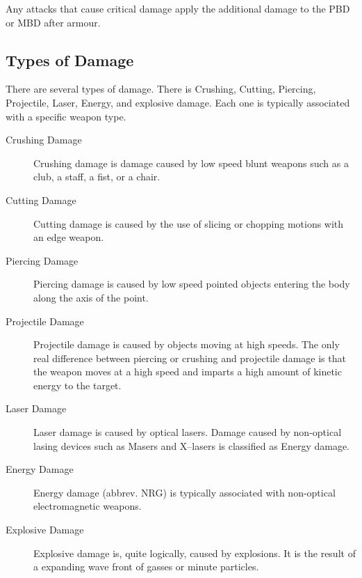 Any attacks that cause critical damage apply the additional damage to
the PBD or MBD after armour.

\subsection{Types of Damage}

There are several types of damage. There is Crushing, Cutting,
Piercing, Projectile, Laser, Energy, and explosive damage. Each one
is typically associated with a specific weapon type.

\begin{description}
	\item[Crushing Damage]
	Crushing damage is damage caused by low speed blunt weapons such as
	a club, a staff, a fist, or a chair.

	\item[Cutting Damage]
	Cutting damage is caused by the use of slicing or chopping motions
	with an edge weapon.

	\item[Piercing Damage]
	Piercing damage is caused by low speed pointed objects entering the
	body along the axis of the point.

	\item[Projectile Damage]
	Projectile damage is caused by objects moving at high speeds. The
	only real difference between piercing or crushing and projectile
	damage is that the weapon moves at a high speed and imparts a
	high amount of kinetic energy to the target.

	\item[Laser Damage]
	Laser damage is caused by optical lasers. Damage caused by
	non-optical lasing devices such as Masers and X--lasers is classified
	as Energy damage.

	\item[Energy Damage]
	Energy damage (abbrev. NRG) is typically associated with non-optical
	electromagnetic weapons.

	\item[Explosive Damage]
	Explosive damage is, quite logically, caused by explosions. It is
	the result of a expanding wave front of gasses or minute particles.

\end{description}

